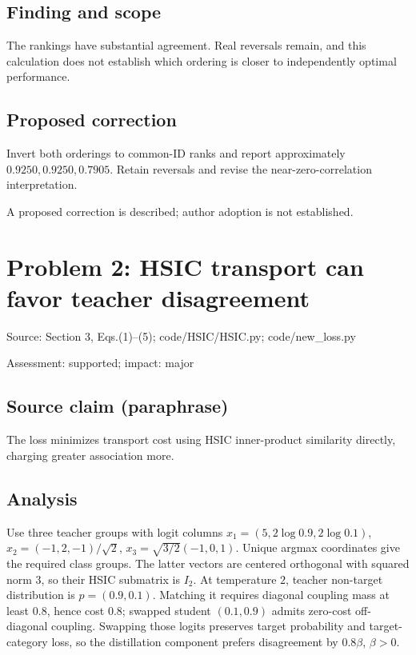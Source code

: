 \documentclass[11pt]{article}
\begin{document}
\subsection*{Finding and scope}

The rankings have substantial agreement. Real reversals remain, and this calculation does not establish which ordering is closer to independently optimal performance.

\subsection*{Proposed correction}

Invert both orderings to common-ID ranks and report approximately \(0.9250,0.9250,0.7905\). Retain reversals and revise the near-zero-correlation interpretation.

A proposed correction is described; author adoption is not established.

\section*{Problem 2: HSIC transport can favor teacher disagreement}

Source: Section 3, Eqs.(1)–(5); code/HSIC/HSIC.py; code/new\_loss.py

Assessment: supported; impact: major

\subsection*{Source claim (paraphrase)}

The loss minimizes transport cost using HSIC inner-product similarity directly, charging greater association more.

\subsection*{Analysis}

Use three teacher groups with logit columns \(x_1=(5,2\log0.9,2\log0.1)\), \(x_2=(-1,2,-1)/\sqrt2\), \(x_3=\sqrt{3/2}(-1,0,1)\). Unique argmax coordinates give the required class groups. The latter vectors are centered orthogonal with squared norm \(3\), so their HSIC submatrix is \(I_2\). At temperature \(2\), teacher non-target distribution is \(p=(0.9,0.1)\). Matching it requires diagonal coupling mass at least \(0.8\), hence cost \(0.8\); swapped student \((0.1,0.9)\) admits zero-cost off-diagonal coupling. Swapping those logits preserves target probability and target-category loss, so the distillation component prefers disagreement by \(0.8\beta\), \(\beta>0\).
\end{document}
